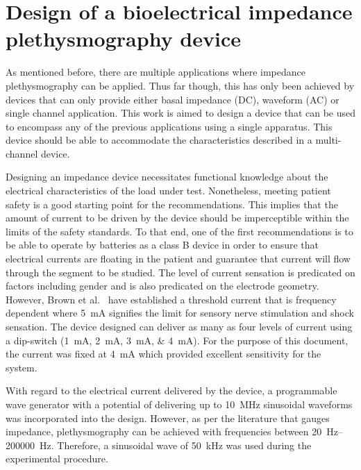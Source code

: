 
\chapter{Design of a bioelectrical impedance plethysmography device}
\label{chapter design}

\ifpdf
    \graphicspath{{Chapter4/Figs/Raster/}{Chapter4/Figs/PDF/}{Chapter4/Figs/}}
\else
    \graphicspath{{Chapter4/Figs/Vector/}{Chapter4/Figs/}}
\fi


As mentioned before, there are multiple applications where impedance plethysmography can be applied. Thus far though, this has only been achieved by devices that can only provide either basal impedance (DC), waveform (AC) or single channel application. This work is aimed to design a device that can be used to encompass any of the previous applications using a single apparatus. This device should be able to accommodate the characteristics described in a multi-channel device.  

Designing an impedance device necessitates functional knowledge about the electrical characteristics of the load under test. Nonetheless, meeting patient safety is a good starting point for the recommendations. This implies that the amount of current to be driven by the device should be imperceptible within the limits of the safety standards. To that end, one of the first recommendations is to be able to operate by batteries as a class B device in order to ensure that electrical currents are floating in the patient and guarantee that current will flow through the segment to be studied. The level of current sensation is predicated on factors including gender and is also predicated on the electrode geometry. However, Brown et al.~\cite{brown1998medical} have established a threshold current that is frequency dependent where \SI{5}{\mA} signifies the limit for sensory nerve stimulation and shock sensation. The device designed can deliver as many as four levels of current using a dip-switch (\SIlist{1;2;3;4}{\mA}). For the purpose of this document, the current was fixed at \SI{4}{\mA} which provided excellent sensitivity for the system. 

With regard to the electrical current delivered by the device, a programmable wave generator with a potential of delivering up to \SI{10}{\MHz} sinusoidal waveforms was incorporated into the design. However, as per the literature that gauges impedance, plethysmography can be achieved with frequencies between \SIrange[scientific-notation = engineering]{20}{200000}{\hertz}. Therefore, a sinusoidal wave of \SI{50}{\kilo\hertz} was used during the experimental procedure.

